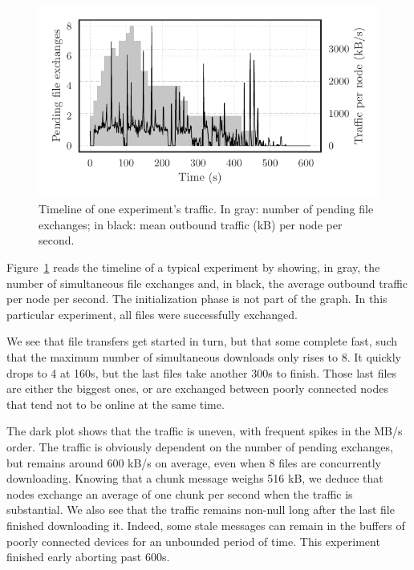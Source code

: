 \begin{figure}[t]
  \centering
  \includegraphics[width=\columnwidth]{figures/bw_and_pending_files.pdf}

  \caption{\label{fig:bw_and_pending_files}Timeline of one experiment's traffic.
  In gray: number of pending file exchanges; in black: mean outbound traffic (kB) per node per second.}
\end{figure}


Figure~\ref{fig:bw_and_pending_files} reads the timeline of a typical experiment by showing, 
in gray, the number of simultaneous file exchanges and, in black, the average outbound traffic per node per second.
The initialization phase is not part of the graph. 
In this particular experiment, all files were successfully exchanged.

We see that file transfers get started in turn, but that some complete fast, such that the maximum number of simultaneous downloads only rises to 8.
It quickly drops to 4 at 160s, but the last files take another 300s to finish. 
Those last files are either the biggest ones, or are exchanged between poorly connected nodes that tend not to be online at the same time.

The dark plot shows that the traffic is uneven, with frequent spikes in the MB/s order. 
The traffic is obviously dependent on the number of pending exchanges, 
but remains around 600 kB/s on average, even when 8 files are concurrently downloading.
Knowing that a chunk message weighs 516 kB, we deduce that nodes exchange an average of one chunk per second when the traffic is substantial.
We also see that the traffic remains non-null long after the last file finished downloading it. 
Indeed, some stale messages can remain in the buffers of poorly connected devices for an unbounded period of time.
This experiment finished early aborting past 600s.

